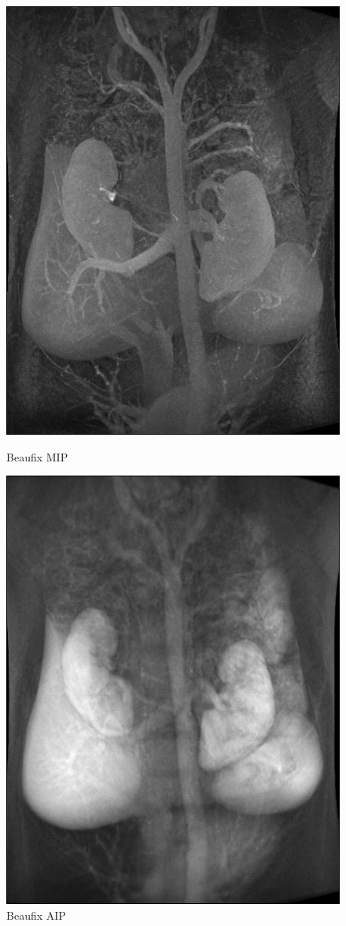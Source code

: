 \documentclass[a4paper,11pt]{article}
\begin{document}
\begin{figure}
\begin{minipage}[c]{.22\linewidth}
	\includegraphics[scale=0.26]{beaufix_MIP.jpg}
	\caption{Beaufix MIP}
   \end{minipage} \hfill
   \begin{minipage}[c]{.22\linewidth}
      \center
	\includegraphics[scale=0.26]{beaufix_AIP.jpg}
	\caption{Beaufix AIP}
   \end{minipage} \hfill
\end{figure}
\end{document}
